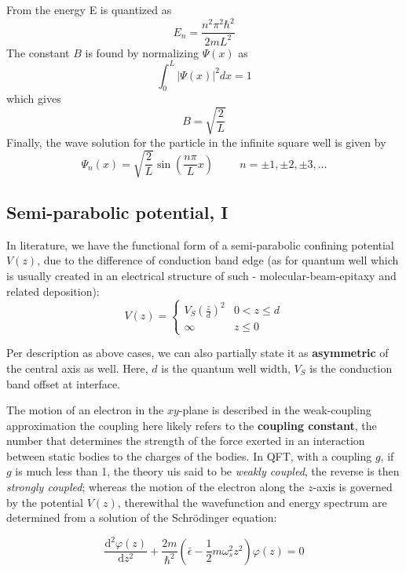 From the energy E is quantized as $$E_{n}= \frac{n^{2}\pi^{2}\hbar^{2}}{2mL^2}$$
The constant $B$ is found by normalizing $\Psi(x)$ as$$\int^{L}_{0}|\Psi(x)|^{2} dx = 1$$
which gives$$B = \sqrt{ \frac{2}{L} }$$
Finally, the wave solution for the particle in the infinite square well is given by $$\Psi_{n}(x)=\sqrt{ \frac{2}{L} } \sin\left( \frac{n\pi}{L}x \right) \hspace{1cm} n =\pm 1, \pm 2, \pm 3, \ldots$$
\subsection{Semi-parabolic potential, I}

  In literature, we have the functional form of a semi-parabolic confining potential $V(z)$, due to the difference of conduction band edge (as for quantum well which is usually created in an electrical structure of such - molecular-beam-epitaxy and related deposition): 
\begin{equation}
  V(z) =
  \begin{cases}
    \displaystyle{V_{S} \left(\frac{z}{d}\right)^{2}} & 0 < z \leq d \\
    \infty & z \leq 0
  \end{cases}
\end{equation}
  
Per description as above cases, we can also partially state it as \textbf{asymmetric} of the central axis as well. Here, $d$ is the quantum well width, $V_S$ is the conduction band offset at interface. 
  
The motion of an electron in the $xy$-plane is described in the weak-coupling approximation the coupling here likely refers to the \textbf{coupling constant}, the number that determines the strength of the force exerted in an interaction between static bodies to the charges of the bodies. In QFT, with a coupling $g$, if $g$ is much less than 1, the theory uis said to be \textit{weakly coupled}, the reverse is then \textit{strongly coupled}; whereas the motion of the electron along the $z$-axis is governed by the potential $V(z)$, therewithal the wavefunction and energy spectrum are determined from a solution of the Schrödinger equation: 
  
\begin{equation}
  \frac{\mathrm{d}^2 \varphi(z)}{\mathrm{d}z^2} + \frac{2m}{\hbar^2} \left(\bar{\epsilon} - \frac{1}{2} m\omega_{s}^2 z^2  \right) \varphi(z) = 0
\end{equation}
  
